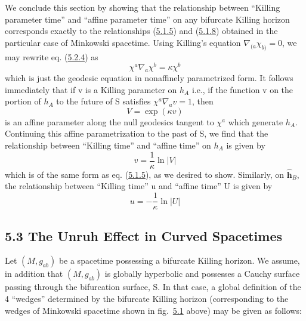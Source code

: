 \documentclass[11pt,a4paper]{article}
\begin{document}
We conclude this section by showing that the relationship between ``Killing parameter time'' and ``affine parameter time'' on any bifurcate Killing horizon corresponds exactly to the relationships (\hyperref[eq:5.1.5]{5.1.5}) and (\hyperref[eq:5.1.8]{5.1.8}) obtained in the particular case of Minkowski spacetime. Using Killing's equation \(\nabla_{(a}\chi_{b)}=0\), we may rewrite eq. (\hyperref[eq:5.2.4]{5.2.4}) as
\begin{equation*}
\chi^a \nabla_a \chi^b = \kappa \chi^b \tag{5.2.8}\label{eq:5.2.8}
\end{equation*}
which is just the geodesic equation in nonaffinely parametrized form. It follows immediately that if v is a Killing parameter on \(h_A\) i.e., if the function v on the portion of \(h_A\) to the future of S satisfies \(\chi^a \nabla_a v = 1\), then
\begin{equation*}
V = \exp(\kappa v) \tag{5.2.9}\label{eq:5.2.9}
\end{equation*}
is an affine parameter along the null geodesics tangent to \(\chi^a\) which generate \(h_A\). Continuing this affine parametrization to the past of S, \hypertarget{source-136}{} we find that the relationship between ``Killing time'' and ``affine time'' on \(h_{A}\) is given by
\begin{equation*}
v = \frac{1}{\kappa} \ln|V| \tag{5.2.10}\label{eq:5.2.10}
\end{equation*}
which is of the same form as eq. (\hyperref[eq:5.1.5]{5.1.5}), as we desired to show. Similarly, on \(\mathbf{\hat{h}}_B\), the relationship between ``Killing time'' u and ``affine time'' U is given by
\begin{equation*}
u = -\frac{1}{\kappa} \ln |U| \tag{5.2.11}\label{eq:5.2.11}
\end{equation*}

\subsection*{5.3 The Unruh Effect in Curved Spacetimes}\hypertarget{sec:5.3}{}

Let \((M, g_{ab})\) be a spacetime possessing a bifurcate Killing horizon. We assume, in addition that \((M, g_{ab})\) is globally hyperbolic and possesses a Cauchy surface passing through the bifurcation surface, S. In that case, a global definition of the 4 ``wedges'' determined by the bifurcate Killing horizon (corresponding to the wedges of Minkowski spacetime shown in fig.~\hyperref[fig:5.1]{5.1} above) may be given as follows:
\end{document}
